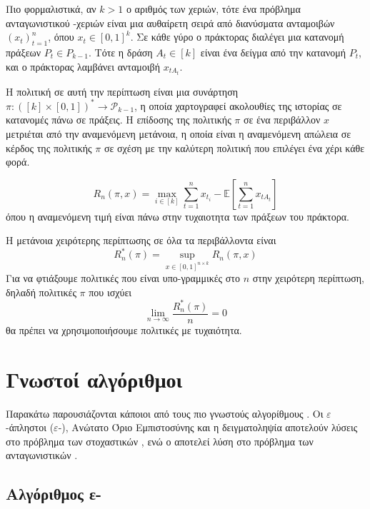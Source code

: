 Πιο φορμαλιστικά, αν $k>1$ ο αριθμός των χεριών, τότε ένα πρόβλημα ανταγωνιστικού  -χεριών είναι μια αυθαίρετη σειρά από διανύσματα ανταμοιβών $(x_t)_{t=1}^n$, όπου $x_t \in [0,1]^k$. Σε κάθε γύρο ο πράκτορας διαλέγει μια κατανομή πράξεων $P_t \in P_{k-1}$. Τότε η δράση $A_t \in [k]$ είναι ένα δείγμα από την κατανομή $P_t$, και ο πράκτορας λαμβάνει ανταμοιβή $x_{tA_t}$.

Η πολιτική σε αυτή την περίπτωση είναι μια συνάρτηση $π: ([k] \times [0,1])^* \rightarrow \mathcal{P}_{k-1}$, η οποία χαρτογραφεί ακολουθίες της ιστορίας σε κατανομές πάνω σε πράξεις.
Η επίδοσης της πολιτικής $π$ σε ένα περιβάλλον $x$ μετριέται από την αναμενόμενη μετάνοια, η οποία είναι η αναμενόμενη απώλεια σε κέρδος της πολιτικής $π$ σε σχέση με την καλύτερη πολιτική που επιλέγει ένα χέρι κάθε φορά.

\begin{equation}
    R_n(π,x) = \max_{i \in [k]} \sum_{t=1}^n x_{t_i} - \mathbb{E}\left[\sum_{t=1}^n x_{tA_t}\right]
\end{equation}
όπου η αναμενόμενη τιμή είναι πάνω στην τυχαιοτητα των πράξεων του πράκτορα.

Η μετάνοια χειρότερης περίπτωσης σε όλα τα περιβάλλοντα είναι
\begin{equation*}
    R_n^*(π) =  \sup_{x \in [0,1]^{n \times k}} R_n(π,x)
\end{equation*}
Για να φτιάξουμε πολιτικές που είναι υπο-γραμμικές στο $n$ στην χειρότερη περίπτωση, δηλαδή πολιτικές $π$ που ισχύει
\begin{equation*}
    \lim_{n \to \infty} \frac{R^*_n(π)}{n} = 0
\end{equation*}
θα πρέπει να χρησιμοποιήσουμε πολιτικές με τυχαιότητα.

\section{Γνωστοί αλγόριθμοι}

Παρακάτω παρουσιάζονται κάποιοι από τους πιο γνωστούς αλγορίθμους . Οι $ε$-άπληστοι ($ε$-), Ανώτατο Όριο Εμπιστοσύνης  και η δειγματοληψία  αποτελούν λύσεις στο πρόβλημα των στοχαστικών , ενώ ο  αποτελεί λύση στο πρόβλημα των ανταγωνιστικών .

\subsection{Αλγόριθμος ε-}

